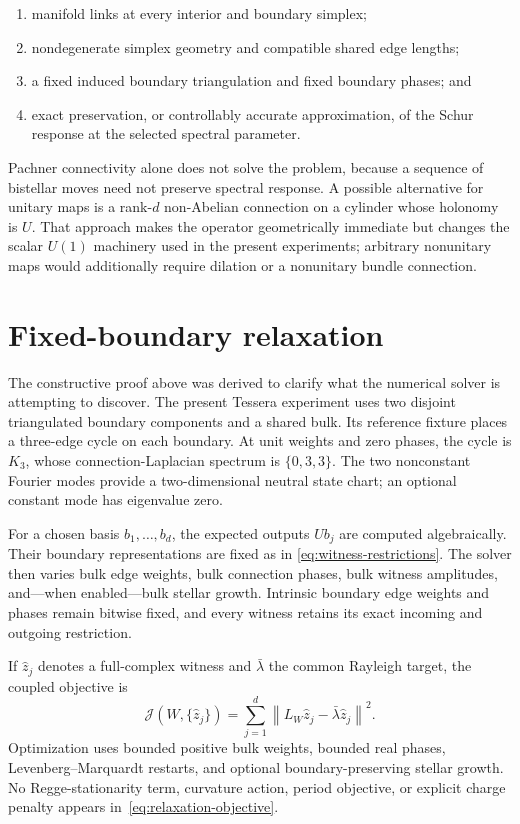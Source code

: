 \documentclass[11pt]{article}
\numberwithin{equation}{section}
\theoremstyle{definition}
\theoremstyle{remark}
\newcommand{\norm}[1]{\left\lVert #1\right\rVert}
\begin{document}
\begin{enumerate}[label=(\arabic*)]
  \item manifold links at every interior and boundary simplex;
  \item nondegenerate simplex geometry and compatible shared edge lengths;
  \item a fixed induced boundary triangulation and fixed boundary phases; and
  \item exact preservation, or controllably accurate approximation, of the
  Schur response at the selected spectral parameter.
\end{enumerate}

Pachner connectivity alone does not solve the problem, because a sequence of
bistellar moves need not preserve spectral response.  A possible alternative
for unitary maps is a rank-$d$ non-Abelian connection on a cylinder whose
holonomy is $U$.  That approach makes the operator geometrically immediate but
changes the scalar $U(1)$ machinery used in the present experiments; arbitrary
nonunitary maps would additionally require dilation or a nonunitary bundle
connection.

\section{Fixed-boundary relaxation}
\label{sec:relaxation}

The constructive proof above was derived to clarify what the numerical solver
is attempting to discover.  The present Tessera experiment uses two disjoint
triangulated boundary components and a shared bulk.  Its reference fixture
places a three-edge cycle on each boundary.  At unit weights and zero phases,
the cycle is $K_3$, whose connection-Laplacian spectrum is $\{0,3,3\}$.  The
two nonconstant Fourier modes provide a two-dimensional neutral state chart;
an optional constant mode has eigenvalue zero.

For a chosen basis $b_1,\ldots,b_d$, the expected outputs $Ub_j$ are computed
algebraically.  Their boundary representations are fixed as in
\cref{eq:witness-restrictions}.  The solver then varies bulk edge weights,
bulk connection phases, bulk witness amplitudes, and---when enabled---bulk
stellar growth.  Intrinsic boundary edge weights and phases remain bitwise
fixed, and every witness retains its exact incoming and outgoing restriction.

If $\widehat z_j$ denotes a full-complex witness and $\bar\lambda$ the common
Rayleigh target, the coupled objective is
\begin{equation}
  \mathcal J(W,\{\widehat z_j\})
  =\sum_{j=1}^d
  \norm{L_W\widehat z_j-\bar\lambda\widehat z_j}^2.
  \label{eq:relaxation-objective}
\end{equation}
Optimization uses bounded positive bulk weights, bounded real phases,
Levenberg--Marquardt restarts, and optional boundary-preserving stellar growth.
No Regge-stationarity term, curvature action, period objective, or explicit
charge penalty appears in~\eqref{eq:relaxation-objective}.
\end{document}
